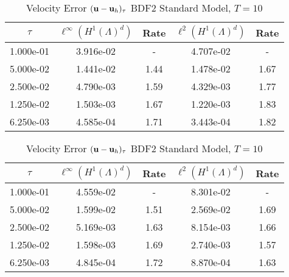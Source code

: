 \documentclass[letterpaper]{erdc}
\begin{document}
\begin{table}[h!]
  \parbox{.45\linewidth}{
  \tiny
  \centering
    \caption{Velocity Error $(\textbf{u} - \textbf{u}_h)_{\tau}$ BDF2 Rotational Model, $T=10$}
    \begin{tabular}{c|c|c|c|c}
      $\tau$ &  $\ell^{\infty}\left(H^1(\Lambda)^d\right)$ &  Rate  &  $\ell^2\left(H^1(\Lambda)^d\right)$  &  Rate\\
      \hline
      1.000e-01 & 3.916e-02 &   -  & 4.707e-02 &   - \\
      5.000e-02 & 1.441e-02 & 1.44 & 1.478e-02 & 1.67\\
      2.500e-02 & 4.790e-03 & 1.59 & 4.329e-03 & 1.77\\
      1.250e-02 & 1.503e-03 & 1.67 & 1.220e-03 & 1.83\\
      6.250e-03 & 4.585e-04 & 1.71 & 3.443e-04 & 1.82
    \end{tabular}
    }
    \hfill
    \parbox{.45\linewidth}{
    \tiny
    \centering
      \caption{Velocity Error $(\textbf{u} - \textbf{u}_h)_{\tau}$ BDF2 Standard Model, $T=10$}
      \begin{tabular}{c|c|c|c|c}
        $\tau$ &  $\ell^{\infty}\left(H^1(\Lambda)^d\right)$ &  Rate  &  $\ell^2\left(H^1(\Lambda)^d\right)$  &  Rate\\
        \hline
        1.000e-01 & 4.559e-02 &   -  & 8.301e-02 &   - \\
        5.000e-02 & 1.599e-02 & 1.51 & 2.569e-02 & 1.69\\
        2.500e-02 & 5.169e-03 & 1.63 & 8.154e-03 & 1.66\\
        1.250e-02 & 1.598e-03 & 1.69 & 2.740e-03 & 1.57\\
        6.250e-03 & 4.845e-04 & 1.72 & 8.870e-04 & 1.63
      \end{tabular}\tiny
    }
\end{table}
\end{document}
